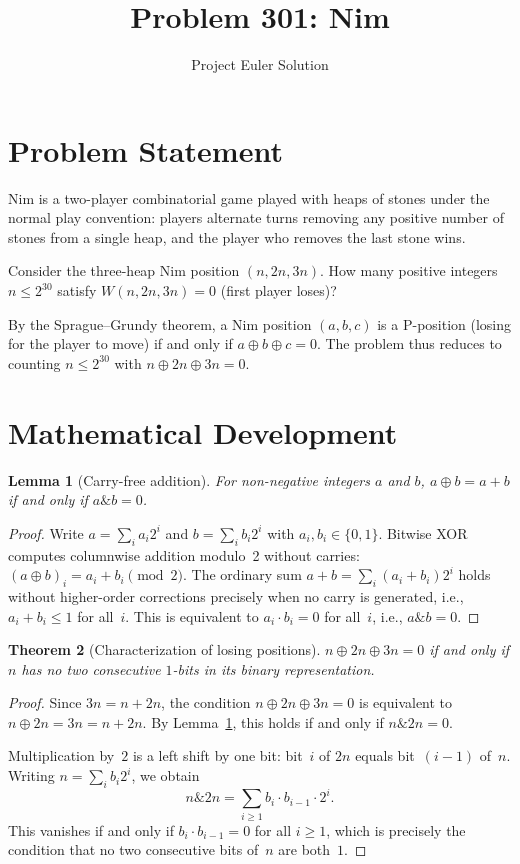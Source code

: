 \documentclass[12pt]{article}
\title{Problem 301: Nim}
\author{Project Euler Solution}
\date{}
\newtheorem{theorem}{Theorem}
\newtheorem{lemma}[theorem]{Lemma}
\begin{document}
\maketitle

\section{Problem Statement}
Nim is a two-player combinatorial game played with heaps of stones under the normal play convention: players alternate turns removing any positive number of stones from a single heap, and the player who removes the last stone wins.

Consider the three-heap Nim position $(n, 2n, 3n)$. How many positive integers $n \le 2^{30}$ satisfy $W(n, 2n, 3n) = 0$ (first player loses)?

By the Sprague--Grundy theorem, a Nim position $(a,b,c)$ is a P-position (losing for the player to move) if and only if $a \oplus b \oplus c = 0$. The problem thus reduces to counting $n \le 2^{30}$ with $n \oplus 2n \oplus 3n = 0$.

\section{Mathematical Development}

\begin{lemma}[Carry-free addition]\label{lem:xor-add}
For non-negative integers $a$ and $b$, $a \oplus b = a + b$ if and only if $a \mathbin{\&} b = 0$.
\end{lemma}

\begin{proof}
Write $a = \sum_i a_i 2^i$ and $b = \sum_i b_i 2^i$ with $a_i, b_i \in \{0,1\}$. Bitwise XOR computes columnwise addition modulo~2 without carries: $(a \oplus b)_i = a_i + b_i \pmod{2}$. The ordinary sum $a + b = \sum_i (a_i + b_i)2^i$ holds without higher-order corrections precisely when no carry is generated, i.e., $a_i + b_i \le 1$ for all~$i$. This is equivalent to $a_i \cdot b_i = 0$ for all~$i$, i.e., $a \mathbin{\&} b = 0$.
\end{proof}

\begin{theorem}[Characterization of losing positions]\label{thm:consec}
$n \oplus 2n \oplus 3n = 0$ if and only if $n$ has no two consecutive $1$-bits in its binary representation.
\end{theorem}

\begin{proof}
Since $3n = n + 2n$, the condition $n \oplus 2n \oplus 3n = 0$ is equivalent to $n \oplus 2n = 3n = n + 2n$. By Lemma~\ref{lem:xor-add}, this holds if and only if $n \mathbin{\&} 2n = 0$.

Multiplication by~$2$ is a left shift by one bit: bit~$i$ of $2n$ equals bit~$(i{-}1)$ of~$n$. Writing $n = \sum_i b_i 2^i$, we obtain
\[
n \mathbin{\&} 2n = \sum_{i \ge 1} b_i \cdot b_{i-1} \cdot 2^i.
\]
This vanishes if and only if $b_i \cdot b_{i-1} = 0$ for all $i \ge 1$, which is precisely the condition that no two consecutive bits of~$n$ are both~$1$.
\end{proof}
\end{document}

